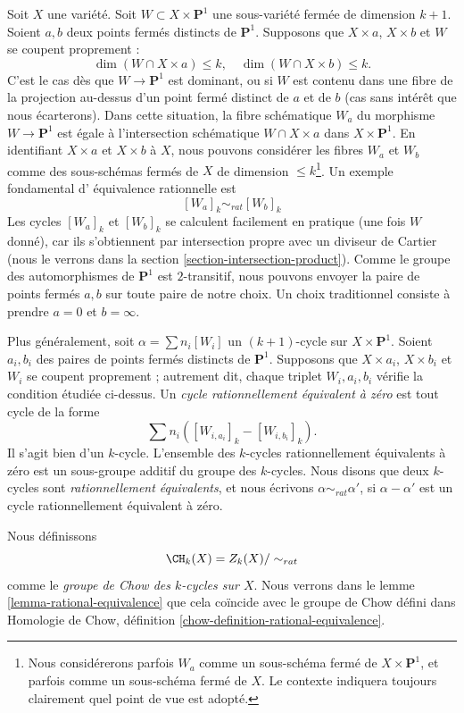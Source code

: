 \medskip\noindent
Soit $X$ une variété. Soit $W \subset X \times \mathbf{P}^1$
une sous-variété fermée de dimension $k + 1$. Soient $a, b$ deux points fermés distincts
de $\mathbf{P}^1$. Supposons que $X \times a$, $X \times b$ et $W$
se coupent proprement :
$$
\dim (W \cap X \times a) \leq k,\quad
\dim (W \cap X \times b) \leq k.
$$
C'est le cas dès que $W \to \mathbf{P}^1$ est dominant, ou si $W$ est
contenu dans une fibre de la projection au-dessus d'un point fermé distinct de
$a$ et de $b$ (cas sans intérêt que nous écarterons). Dans cette
situation, la fibre schématique $W_a$ du morphisme
$W \to \mathbf{P}^1$ est égale à l'intersection schématique
$W \cap X \times a$ dans $X \times \mathbf{P}^1$. En identifiant $X \times a$
et $X \times b$ à $X$, nous pouvons considérer les fibres $W_a$ et $W_b$
comme des sous-schémas fermés de $X$ de dimension $\leq k$\footnote{Nous considérerons parfois
$W_a$ comme un sous-schéma fermé de $X \times \mathbf{P}^1$, et parfois
comme un sous-schéma fermé de $X$. Le contexte indiquera toujours clairement quel
point de vue est adopté.}. Un exemple fondamental d'
équivalence rationnelle est
$$
[W_a]_k \sim_{rat} [W_b]_k
$$
Les cycles $[W_a]_k$ et $[W_b]_k$ se calculent facilement en pratique
(une fois $W$ donné), car ils s'obtiennent par intersection propre avec
un diviseur de Cartier (nous le verrons dans la
section \ref{section-intersection-product}).
Comme le groupe des automorphismes de $\mathbf{P}^1$ est $2$-transitif, nous pouvons
envoyer la paire de points fermés $a, b$ sur toute paire de notre choix. Un choix
traditionnel consiste à prendre $a = 0$ et $b = \infty$.

\medskip\noindent
Plus généralement, soit $\alpha = \sum n_i [W_i]$ un $(k + 1)$-cycle sur
$X \times \mathbf{P}^1$. Soient $a_i, b_i$ des paires de points fermés distincts de
$\mathbf{P}^1$. Supposons que $X \times a_i$, $X \times b_i$ et $W_i$ se coupent
proprement ; autrement dit, chaque triplet $W_i, a_i, b_i$ vérifie la condition
étudiée ci-dessus. Un {\it cycle rationnellement équivalent à zéro} est tout cycle
de la forme
$$
\sum n_i([W_{i, a_i}]_k - [W_{i, b_i}]_k).
$$
Il s'agit bien d'un $k$-cycle. L'ensemble des $k$-cycles rationnellement
équivalents à zéro est un sous-groupe additif du groupe des $k$-cycles.
Nous disons que deux $k$-cycles sont {\it rationnellement équivalents}, et nous écrivons
$\alpha \sim_{rat} \alpha'$, si $\alpha - \alpha'$ est un cycle rationnellement
équivalent à zéro.

\medskip\noindent
Nous définissons
$$
\CH_k(X) = Z_k(X)/ \sim_{rat}
$$
comme le {\it groupe de Chow des $k$-cycles sur $X$}. Nous verrons dans le
lemme \ref{lemma-rational-equivalence}
que cela coïncide avec le groupe de Chow défini dans
Homologie de Chow, définition \ref{chow-definition-rational-equivalence}.


